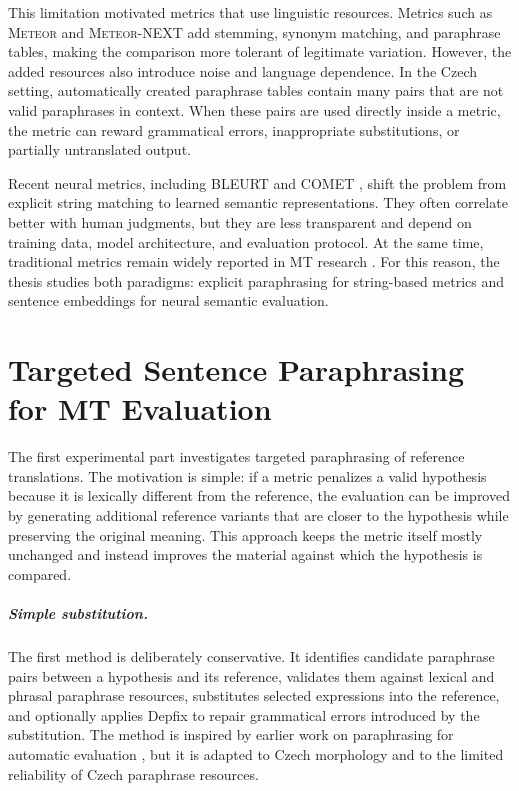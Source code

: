\documentclass[12pt,a4paper]{report}
\newcommand{\meteor}{\textsc{Meteor}\xspace}
\newcommand{\mn}{\textsc{Meteor-NEXT}\xspace}
\newcommand{\comet}{\textsc{COMET}\xspace}
\newcommand{\bleurt}{\textsc{BLEURT}\xspace}
\begin{document}
This limitation motivated metrics that use linguistic resources. Metrics such as \meteor 
and \mn add stemming, synonym matching, and paraphrase tables, making the comparison more 
tolerant of legitimate variation. However, the added resources also introduce noise and 
language dependence. In the Czech setting, automatically created paraphrase tables contain 
many pairs that are not valid paraphrases in context. When these pairs are used directly 
inside a metric, the metric can reward grammatical errors, inappropriate substitutions, or 
partially untranslated output.

Recent neural metrics, including \bleurt \citep{sellam2020bleurt} and \comet 
\citep{rei-etal-2020-comet}, shift the problem from explicit string matching to learned 
semantic representations. They often correlate better with human judgments, but they are 
less transparent and depend on training data, model architecture, and evaluation protocol. 
At the same time, traditional metrics remain widely reported in MT research 
\citep{marie-etal-2021-scientific}. For this reason, the thesis studies both paradigms: 
explicit paraphrasing for string-based metrics and sentence embeddings for neural semantic 
evaluation.

\chapter{Targeted Sentence Paraphrasing for MT Evaluation}

The first experimental part investigates targeted paraphrasing of reference translations. 
The motivation is simple: if a metric penalizes a valid hypothesis because it is lexically 
different from the reference, the evaluation can be improved by generating additional 
reference variants that are closer to the hypothesis while preserving the original meaning. 
This approach keeps the metric itself mostly unchanged and instead improves the material 
against which the hypothesis is compared.

\paragraph{Simple substitution.}
The first method is deliberately conservative. It identifies candidate paraphrase pairs 
between a hypothesis and its reference, validates them against lexical and phrasal paraphrase 
resources, substitutes selected expressions into the reference, and optionally applies Depfix 
to repair grammatical errors introduced by the substitution. The method is inspired by earlier 
work on paraphrasing for automatic evaluation \citep{kauchak}, but it is adapted to Czech
morphology and to the limited reliability of Czech paraphrase resources.
\end{document}
